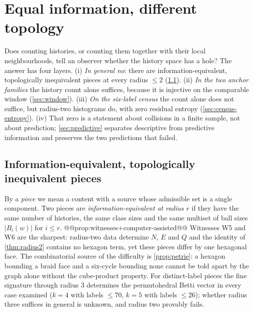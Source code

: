\chapter{Equal information, different topology}\label{ch:separation}

Does counting histories, or counting them together with their local neighbourhoods, tell an observer whether the history space has a hole? The answer has four layers. (i) \emph{In general no}: there are information-equivalent, topologically inequivalent pieces at every radius $\le2$ (\cref{sec:witnesses}). (ii) \emph{In the two anchor families} the history count alone suffices, because it is injective on the comparable window (\cref{sec:window}). (iii) \emph{On the six-label census} the count alone does not suffice, but radius-two histograms do, with zero residual entropy (\cref{sec:census-entropy}). (iv) That zero is a statement about collisions in a finite sample, not about prediction; \cref{sec:predictive} separates descriptive from predictive information and preserves the two predictions that failed.

\section{Information-equivalent, topologically inequivalent pieces}\label{sec:witnesses}
By a \emph{piece} we mean a content with a source whose admissible set is a single component. Two pieces are \emph{information-equivalent at radius $r$} if they have the same number of histories, the same class sizes and the same multiset of ball sizes $|B_i(w)|$ for $i\le r$.
@@prop:witnesses+computer-assisted@@
Witnesses W5 and W6 are the sharpest: radius-two data determine $N$, $E$ and $Q$ and the identity of \cref{thm:radius2} contains no hexagon term, yet these pieces differ by one hexagonal face. The combinatorial source of the difficulty is \cref{prop:petrie}: a hexagon bounding a braid face and a six-cycle bounding none cannot be told apart by the graph alone without the cube-product property.
For distinct-label pieces the fine signature through radius $3$ determines the permutohedral Betti vector in every case examined ($k=4$ with labels $\le70$, $k=5$ with labels $\le26$); whether radius three suffices in general is unknown, and radius two provably fails.

